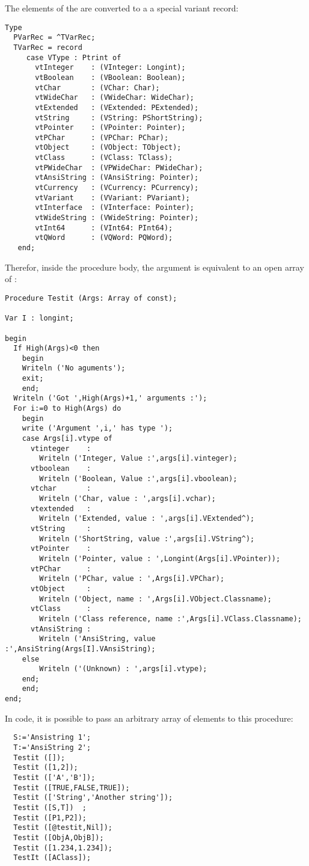 The elements of the  are converted to a a special variant record:
\begin{verbatim}
Type
  PVarRec = ^TVarRec;
  TVarRec = record
     case VType : Ptrint of
       vtInteger    : (VInteger: Longint);
       vtBoolean    : (VBoolean: Boolean);
       vtChar       : (VChar: Char);
       vtWideChar   : (VWideChar: WideChar);
       vtExtended   : (VExtended: PExtended);
       vtString     : (VString: PShortString);
       vtPointer    : (VPointer: Pointer);
       vtPChar      : (VPChar: PChar);
       vtObject     : (VObject: TObject);
       vtClass      : (VClass: TClass);
       vtPWideChar  : (VPWideChar: PWideChar);
       vtAnsiString : (VAnsiString: Pointer);
       vtCurrency   : (VCurrency: PCurrency);
       vtVariant    : (VVariant: PVariant);
       vtInterface  : (VInterface: Pointer);
       vtWideString : (VWideString: Pointer);
       vtInt64      : (VInt64: PInt64);
       vtQWord      : (VQWord: PQWord);
   end;
\end{verbatim}
Therefor, inside the procedure body, the  argument is equivalent to
an open array of :
\begin{verbatim}
Procedure Testit (Args: Array of const);

Var I : longint;

begin
  If High(Args)<0 then
    begin
    Writeln ('No aguments');
    exit;
    end;
  Writeln ('Got ',High(Args)+1,' arguments :');
  For i:=0 to High(Args) do
    begin
    write ('Argument ',i,' has type ');
    case Args[i].vtype of
      vtinteger    :
        Writeln ('Integer, Value :',args[i].vinteger);
      vtboolean    :
        Writeln ('Boolean, Value :',args[i].vboolean);
      vtchar       :
        Writeln ('Char, value : ',args[i].vchar);
      vtextended   :
        Writeln ('Extended, value : ',args[i].VExtended^);
      vtString     :
        Writeln ('ShortString, value :',args[i].VString^);
      vtPointer    :
        Writeln ('Pointer, value : ',Longint(Args[i].VPointer));
      vtPChar      :
        Writeln ('PChar, value : ',Args[i].VPChar);
      vtObject     :
        Writeln ('Object, name : ',Args[i].VObject.Classname);
      vtClass      :
        Writeln ('Class reference, name :',Args[i].VClass.Classname);
      vtAnsiString :
        Writeln ('AnsiString, value :',AnsiString(Args[I].VAnsiString);
    else
        Writeln ('(Unknown) : ',args[i].vtype);
    end;
    end;
end;
\end{verbatim}
In code, it is possible to pass an arbitrary array of elements
to this procedure:
\begin{verbatim}
  S:='Ansistring 1';
  T:='AnsiString 2';
  Testit ([]);
  Testit ([1,2]);
  Testit (['A','B']);
  Testit ([TRUE,FALSE,TRUE]);
  Testit (['String','Another string']);
  Testit ([S,T])  ;
  Testit ([P1,P2]);
  Testit ([@testit,Nil]);
  Testit ([ObjA,ObjB]);
  Testit ([1.234,1.234]);
  TestIt ([AClass]);
\end{verbatim}

